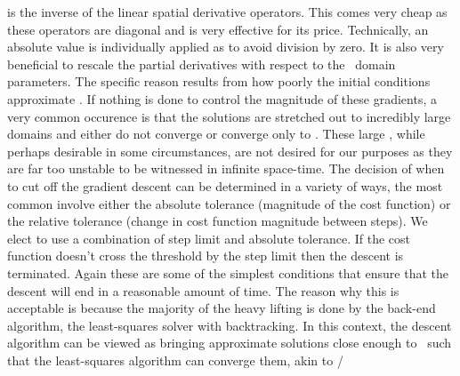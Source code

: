 \begin{description}
{is the inverse of the linear spatial derivative operators. This comes very cheap
as these operators are diagonal and is very effective for its price. Technically,
an absolute value is individually applied as to avoid division by zero. It is
also very beneficial to rescale the partial derivatives with respect to the
\spt\ domain parameters. The specific reason results from how poorly the
initial conditions approximate \twots. If nothing is done to control the
magnitude of these gradients, a very common occurence is that the solutions
are stretched out to incredibly large domains and either do not converge
or converge only to \eqva. These large \eqva, while perhaps desirable in
some circumstances, are not desired for our purposes as they are far
too unstable to be witnessed in infinite space-time.
The decision of when to cut off the gradient descent can
be determined in a variety of ways, the most common involve either the
absolute tolerance (magnitude of the cost function) or the relative tolerance
(change in cost function magnitude between steps).
We elect to use a combination of step limit and absolute tolerance. If the
cost function doesn't cross the threshold by the step limit then the descent is terminated.
Again these are some of the simplest conditions that ensure that the descent
will end in a reasonable amount of time.
The reason why this is acceptable is because the majority
of the heavy lifting is done by the back-end algorithm, the least-squares solver with backtracking.
In this context, the descent algorithm can be viewed as bringing approximate solutions
close enough to \twots\ such that the least-squares algorithm can converge them, akin
to /



}
\end{description}

